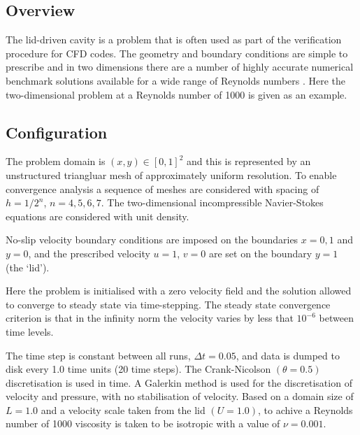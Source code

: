 \subsection{Overview}
The lid-driven cavity is a problem that is often used as part of the verification procedure for
CFD codes. The geometry and boundary conditions are simple to prescribe and in
two dimensions there are a number of highly accurate numerical benchmark solutions
available for a wide range of Reynolds numbers \citep{botella1998,erturk2005,bruneau2006}. 
Here the two-dimensional problem at a Reynolds number of 1000 is given as an example.

\subsection{Configuration}
The problem domain is $(x,y) \in [0,1]^2$ and this is represented by an unstructured triangluar mesh
of approximately uniform resolution. To enable convergence analysis a sequence of meshes are considered
with spacing of $h=1/2^n$, $n=4,5,6,7$. The two-dimensional incompressible Navier-Stokes equations are
considered with unit density.

No-slip velocity boundary conditions are imposed on the boundaries $x=0,1$ and $y=0$, 
and the prescribed velocity $u=1$, $v=0$ are set on the boundary $y=1$ (the `lid'). 

Here the problem is initialised with a zero velocity field and the solution
allowed to converge to steady state via time-stepping. The steady state convergence criterion is
that in the infinity norm the velocity varies by less that $10^{-6}$ between time levels.

The time step is constant between all runs, $\Delta t = 0.05$, and data is dumped to disk every
1.0 time units (20 time steps). The Crank-Nicolson $(\theta=0.5)$ discretisation is used in time. 
A \Poo Galerkin method is used for the discretisation of velocity and pressure, with no stabilisation
of velocity. Based on a domain size of $L=1.0$ and a velocity scale taken from the lid $(U=1.0)$, to achive
a Reynolds number of 1000 viscosity is taken to be isotropic with a value of $\nu=0.001$.

 

